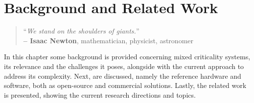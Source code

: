 %
\chapter{Background and Related Work}%
\label{ch:state-art}
%
\begin{quote}
\begin{flushright}
``\emph{We stand on the shoulders of giants.}'' \\
\textbf{-- Isaac Newton}, mathematician, physicist, astronomer
\end{flushright}
\end{quote}

In this chapter some background is provided concerning mixed criticality
systems, its relevance and the challenges it poses, alongside with the current
approach to address its complexity. Next,  are discussed,
namely the reference hardware and software, both as open-source and commercial
solutions. Lastly, the related work is
presented, showing the current research directions and topics.




